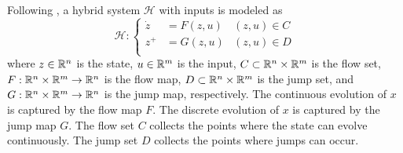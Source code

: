 Following \cite{San2021}, a hybrid system $\mathcal{H}$ with inputs is modeled as 
\begin{equation}
\mathcal{H}: \left\{              
\begin{aligned}               
\dot{z} & = F(z, u)     &(z, u)\in C\\                
z^{+} & =  G(z, u)      &(z, u)\in D\\                
\end{aligned}   \right. 
\label{model:generalhybridsystem}
\end{equation}
where $z\in \mathbb{R}^{n}$ is the state, $u\in \mathbb{R}^{m}$ is the input, $C\subset \mathbb{R}^{n}\times\mathbb{R}^{m}$ is the flow set, $F: \mathbb{R}^{n}\times\mathbb{R}^{m} \to \mathbb{R}^{n}$ is the flow map, $D\subset \mathbb{R}^{n}\times\mathbb{R}^{m}$ is the jump set, and $G:\mathbb{R}^{n}\times\mathbb{R}^{m} \to \mathbb{R}^{n}$ is the jump map, respectively. The continuous evolution of $x$ is captured by the flow map $F$. The discrete evolution of $x$ is captured by the jump map $G$. The flow set $C$ collects the points where the state can evolve continuously. The jump set $D$ collects the points where jumps can occur.

